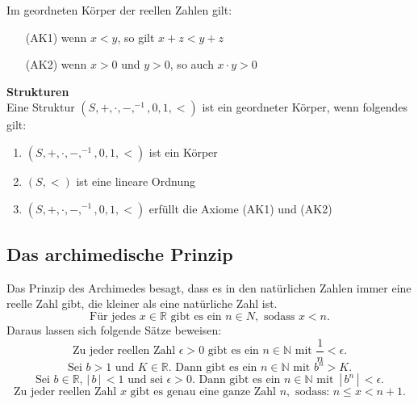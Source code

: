 \documentclass[a4paper,12pt]{article}
\begin{document}
Im geordneten Körper der reellen Zahlen gilt:
\begin{enumerate}[wide,label=]
        \item[(AK1)] wenn $x<y$, so gilt $x+z<y+z$ 
        \item[(AK2)] wenn $x>0$ und $y>0$, so auch $x\cdot y>0$ 
\end{enumerate}
\textbf{Strukturen}\\
Eine Struktur $\left( S,+,\cdot ,-,^{-1},0,1,<\right) $ ist ein geordneter Körper, wenn folgendes gilt:
\begin{enumerate}[wide,label=(\alph*)]
        \item $\left( S,+,\cdot ,-,^{-1},0,1,<\right) $ ist ein Körper
        \item $\left( S,<\right) $ ist eine lineare Ordnung
        \item $\left( S,+,\cdot ,-,^{-1},0,1,<\right) $ erfüllt die Axiome (AK1) und (AK2)
\end{enumerate}

\subsection{Das archimedische Prinzip}
Das Prinzip des Archimedes besagt, dass es in den natürlichen Zahlen immer eine reelle Zahl gibt, die kleiner als eine natürliche Zahl ist.
\[ 
\text{Für jedes }x \in \mathbb{R} \text{ gibt es ein }n  \in N,\text{ sodass }x<n
.\] 
Daraus lassen sich folgende Sätze beweisen:
\[ 
\text{Zu jeder reellen Zahl }\epsilon>0\text{ gibt es ein }n  \in \mathbb{N}\text{ mit }\dfrac{1}{n}<\epsilon
.\] 
\[ 
\text{Sei }b>1\text{ und }K \in \mathbb{R}.\text{ Dann gibt es ein }n  \in \mathbb{N}\text{ mit }b^{n}>K
.\] 
\[ 
\text{Sei }b \in \mathbb{R},\,|\, b\,|\, <1\text{ und sei }\epsilon>0.\text{ Dann gibt es ein }n  \in \mathbb{N} \text{ mit }\,|\, b^{n}\,|\, <\epsilon
.\] 
\[ 
\text{Zu jeder reellen Zahl }x\text{ gibt es genau eine ganze Zahl }n,\text{ sodass: }n\leq x<n+1
.\] 
\end{document}
